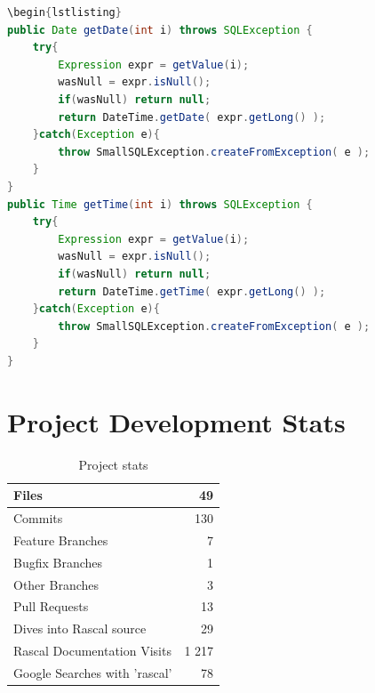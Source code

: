 \documentclass{article}
\begin{document}
\begin{lstlisting}[language={Java}, caption={Duplication Sample}, label={ex:duplication}]
\begin{lstlisting}
public Date getDate(int i) throws SQLException {
    try{
		Expression expr = getValue(i);
        wasNull = expr.isNull();
		if(wasNull) return null;
		return DateTime.getDate( expr.getLong() );
    }catch(Exception e){
        throw SmallSQLException.createFromException( e );
    }
}
public Time getTime(int i) throws SQLException {
    try{
		Expression expr = getValue(i);
        wasNull = expr.isNull();
		if(wasNull) return null;
		return DateTime.getTime( expr.getLong() );
    }catch(Exception e){
        throw SmallSQLException.createFromException( e );
    }
}
\end{lstlisting}

\section{Project Development Stats}

\begin{table}[!htb]
\caption{Project stats}
\begin{tabular}{l|r}	
		\hline
		Files										&			49 \\
		\hline
		Commits										&			130 \\
		\hline
		Feature Branches							&			7 \\
		\hline
		Bugfix Branches								&			1 \\
		\hline
		Other Branches								&			3 \\
		\hline	
		Pull Requests								&			13 \\
		\hline	
		Dives into Rascal source					&			29 \\
		\hline		
		Rascal Documentation Visits					&			1 217 \\ %
		\hline		
		Google Searches with 'rascal'				&			78 \\	%
		\hline		
\end{tabular}
\end{table}
\end{document}
